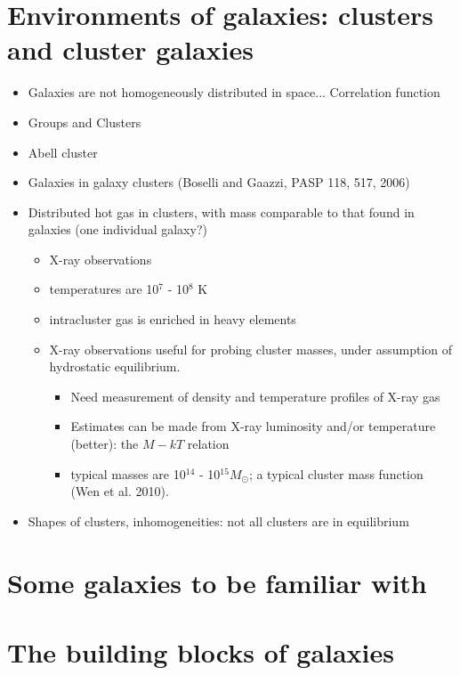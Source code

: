 \documentclass{article}
\begin{document}
\section{Environments of galaxies: clusters and cluster galaxies}
    \begin{itemize}
      \item Galaxies are not homogeneously distributed in space...
      Correlation function
      \item Groups and Clusters
      \item Abell cluster
      \item Galaxies in galaxy clusters (Boselli and Gaazzi, PASP 118,
      517, 2006)
      \item Distributed hot gas in clusters, with mass comparable to
      that found in galaxies (one individual galaxy?)
      \begin{itemize}
        \item X-ray observations
        \item temperatures are 10$^7$ - 10$^8$ K
        \item intracluster gas is enriched in heavy elements
        \item X-ray observations useful for probing cluster masses,
        under assumption of hydrostatic equilibrium.
        \begin{itemize}
          \item Need measurement of density and temperature profiles
          of X-ray gas
          \item Estimates can be made from X-ray luminosity and/or
          temperature (better): the $M - kT$ relation
          \item typical masses are 10$^{14}$ - 10$^{15} M_{\odot}$; a
          typical cluster mass function (Wen et al. 2010).
        \end{itemize}
      \end{itemize}
      \item Shapes of clusters, inhomogeneities: not all clusters are
      in equilibrium
    \end{itemize}

\section{Some galaxies to be familiar with}

\section{The building blocks of galaxies}
\end{document}
